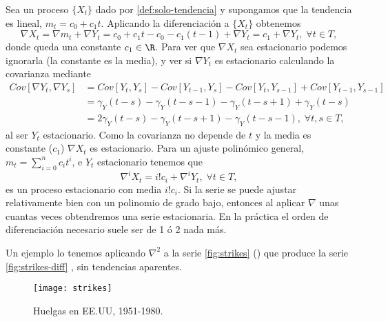 Sea un proceso $\{X_t\}$ dado por \autoref{def:solo-tendencia} y supongamos que la tendencia es lineal, $m_t = c_0 + c_1t$. Aplicando la diferenciación a $\{X_t\}$ obtenemos
\begin{equation*}
  \nabla X_t = \nabla m_t + \nabla Y_t = c_0 + c_1 t - c_0 - c_1(t - 1) + \nabla Y_t = c_1 + \nabla Y_t, \; \forall t \in T,
  \label{eq:diff-tendencia}
\end{equation*}
donde queda una constante $c_1 \in \R$. Para ver que $\nabla X_t$ sea estacionario podemos ignorarla (la constante es la media), y ver si $\nabla Y_t$ es estacionario calculando la covarianza mediante
\begin{equation*}
  \begin{aligned}
  Cov[\nabla Y_t, \nabla Y_s] & = Cov[Y_t, Y_s] - Cov[Y_{t-1}, Y_s] - Cov[Y_t, Y_{s-1}] + Cov[Y_{t-1}, Y_{s-1}] \\
  & = \gamma_Y(t - s) - \gamma_Y(t - s - 1) - \gamma_Y(t - s + 1) + \gamma_Y(t - s) \\
  & = 2\gamma_Y(t - s) - \gamma_Y(t - s + 1) - \gamma_Y(t - s - 1), \; \forall t,s \in T,
  \end{aligned}
  \label{eq:diff-estacionario}
\end{equation*}
al ser $Y_t$ estacionario. Como la covarianza no depende de $t$ y la media es constante ($c_1$) $\nabla X_t$ es estacionario. Para un ajuste polinómico general, $m_t = \sum \limits^n_{i = 0} c_i t^i$, e $Y_t$ estacionario tenemos que
\begin{equation*}
  \nabla^i X_t = i!c_i + \nabla^i Y_t, \; \forall t \in T,
  \label{eq:diff-general}
\end{equation*}
es un proceso estacionario con media $i!c_i$. Si la serie se puede ajustar relativamente bien con un polinomio de grado bajo, entonces al aplicar $\nabla$ unas cuantas veces obtendremos una serie estacionaria. En la práctica el orden de diferenciación necesario suele ser de 1 ó 2 nada más.

Un ejemplo lo tenemos aplicando $\nabla^2$ a la serie \autoref{fig:strikes} (\cite{brockwell2002introduction}) que produce la serie \autoref{fig:strikes-diff} \cite{brockwell2002introduction}, sin tendencias aparentes.

\begin{figure}[htpb]
  \centering
  \texttt{[image: strikes]}
  \caption{Huelgas en EE.UU, 1951-1980.}
  \label{fig:strikes}
\end{figure}

